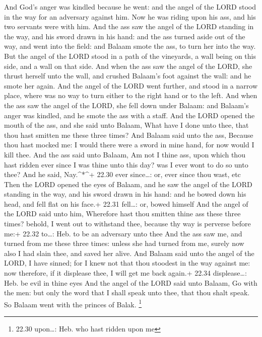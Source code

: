  And God's anger was kindled because he went: and the angel
of the LORD stood in the way for an adversary against him. Now he was
riding upon his ass, and his two servants were with him. 
And the ass saw the angel of the LORD standing in the way, and his sword
drawn in his hand: and the ass turned aside out of the way, and went
into the field: and Balaam smote the ass, to turn her into the way.
 But the angel of the LORD stood in a path of the
vineyards, a wall being on this side, and a wall on that side.
 And when the ass saw the angel of the LORD, she thrust
herself unto the wall, and crushed Balaam's foot against the wall: and
he smote her again.  And the angel of the LORD went
further, and stood in a narrow place, where was no way to turn either to
the right hand or to the left.  And when the ass saw the
angel of the LORD, she fell down under Balaam: and Balaam's anger was
kindled, and he smote the ass with a staff.  And the LORD
opened the mouth of the ass, and she said unto Balaam, What have I done
unto thee, that thou hast smitten me these three times? 
And Balaam said unto the ass, Because thou hast mocked me: I would there
were a sword in mine hand, for now would I kill thee.  And
the ass said unto Balaam, Am not I thine ass, upon which thou hast
ridden ever since I was thine unto this day? was I ever wont to do so
unto thee? And he said, Nay.\^{}*\^{}+ 22.30 ever since\ldots: or, ever
since thou wast, etc  Then the LORD opened the eyes of
Balaam, and he saw the angel of the LORD standing in the way, and his
sword drawn in his hand: and he bowed down his head, and fell flat on
his face.+ 22.31 fell\ldots: or, bowed himself  And the
angel of the LORD said unto him, Wherefore hast thou smitten thine ass
these three times? behold, I went out to withstand thee, because thy way
is perverse before me:+ 22.32 to\ldots: Heb. to be an adversary unto
thee  And the ass saw me, and turned from me these three
times: unless she had turned from me, surely now also I had slain thee,
and saved her alive.  And Balaam said unto the angel of the
LORD, I have sinned; for I knew not that thou stoodest in the way
against me: now therefore, if it displease thee, I will get me back
again.+ 22.34 displease\ldots: Heb. be evil in thine eyes 
And the angel of the LORD said unto Balaam, Go with the men: but only
the word that I shall speak unto thee, that thou shalt speak. So Balaam
went with the princes of Balak. \footnote{22.30 upon\ldots: Heb. who
  hast ridden upon me}

